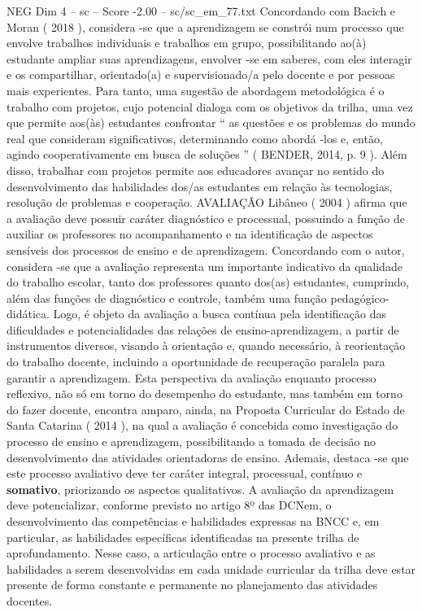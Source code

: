 \begin{textsample}{NEG Dim 4 – sc – Score -2.00 – sc/sc\_em\_77.txt}
Concordando com Bacich e Moran ( 2018 ), considera -se que a aprendizagem se constrói num processo que envolve trabalhos individuais e trabalhos em grupo, possibilitando ao(à) estudante ampliar suas aprendizagens, envolver -se em saberes, com eles interagir e os compartilhar, orientado(a) e supervisionado/a pelo docente e por pessoas mais experientes.
Para tanto, uma sugestão de abordagem metodológica é o trabalho com projetos, cujo potencial dialoga com os objetivos da trilha, uma vez que permite aos(às) estudantes confrontar “ as questões e os problemas do mundo real que consideram significativos, determinando como abordá -los e, então, agindo cooperativamente em busca de soluções ” ( BENDER, 2014, p. 9 ).
Além disso, trabalhar com projetos permite aos educadores avançar no sentido do desenvolvimento das habilidades dos/as estudantes em relação às tecnologias, resolução de problemas e cooperação.
AVALIAÇÃO Libâneo ( 2004 ) afirma que a avaliação deve possuir caráter diagnóstico e processual, possuindo a função de auxiliar os professores no acompanhamento e na identificação de aspectos sensíveis dos processos de ensino e de aprendizagem.
Concordando com o autor, considera -se que a avaliação representa um importante indicativo da qualidade do trabalho escolar, tanto dos professores quanto dos(as) estudantes, cumprindo, além das funções de diagnóstico e controle, também uma função pedagógico-didática.
Logo, é objeto da avaliação a busca contínua pela identificação das dificuldades e potencialidades das relações de ensino-aprendizagem, a partir de instrumentos diversos, visando à orientação e, quando necessário, à reorientação do trabalho docente, incluindo a oportunidade de recuperação paralela para garantir a aprendizagem.
Esta perspectiva da avaliação enquanto processo reflexivo, não só em torno do desempenho do estudante, mas também em torno do fazer docente, encontra amparo, ainda, na Proposta Curricular do Estado de Santa Catarina ( 2014 ), na qual a avaliação é concebida como investigação do processo de ensino e aprendizagem, possibilitando a tomada de decisão no desenvolvimento das atividades orientadoras de ensino.
Ademais, destaca -se que este processo avaliativo deve ter caráter integral, processual, contínuo e \textbf{somativo}, priorizando os aspectos qualitativos.
A avaliação da aprendizagem deve potencializar, conforme previsto no artigo 8º das DCNem, o desenvolvimento das competências e habilidades expressas na BNCC e, em particular, as habilidades específicas identificadas na presente trilha de aprofundamento.
Nesse caso, a articulação entre o processo avaliativo e as habilidades a serem desenvolvidas em cada unidade curricular da trilha deve estar presente de forma constante e permanente no planejamento das atividades docentes.

\end{textsample}
